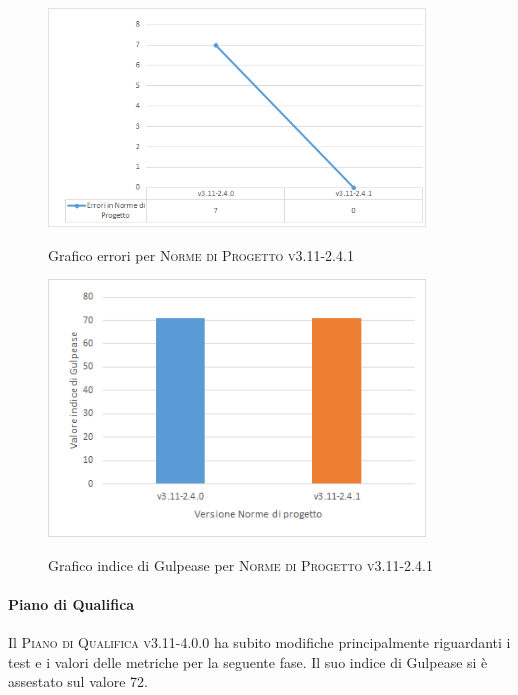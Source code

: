 \begin{figure}[H]
  \centering
  \includegraphics[width=10cm]{img/erroriNdPv3.11-2.4.1.png}
  \label{fig:errori_ndp}
  \caption{Grafico errori per \textsc{Norme di Progetto v3.11-2.4.1}}
\end{figure}

\begin{figure}[H]
  \centering
  \includegraphics[width=10cm]{img/gulpeaseNdPv3.11-2.4.1.png}
  \label{fig:gulpease_ndp}
  \caption{Grafico indice di Gulpease per \textsc{Norme di Progetto v3.11-2.4.1}}
\end{figure}


\paragraph{Piano di Qualifica}
\label{sub:piano_di_qualifica}
Il \textsc{Piano di Qualifica v3.11-4.0.0} ha subito modifiche principalmente riguardanti i test e i valori delle metriche per la seguente fase.
Il suo indice di Gulpease si è assestato sul valore 72.

